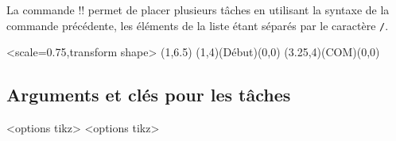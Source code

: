 \documentclass[french,a4paper,11pt]{article}
\begin{document}
\begin{tipblock}
La commande \motcletex!\MPMPlaceTaches! permet de placer plusieurs tâches en utilisant la syntaxe de la commande précédente, les éléments de la liste étant séparés par le caractère \verb!/!.
\end{tipblock}

\begin{DemoCode}[]
\begin{GrapheMPM}[CouleurDates=green/orange,CouleurBords=brown,Grille={18,8}]%
	<scale=0.75,transform shape>
	\MPMPlaceNotice(1,6.5)
	\MPMPlaceTache(1,4)(Début)(0,0)
	\MPMPlaceTache(3.25,4)(COM)(0,0)
\end{GrapheMPM}
\end{DemoCode}

\pagebreak

\subsection{Arguments et clés pour les tâches}

\begin{DemoCode}
\begin{GrapheMPM}[clés]<options tikz>
	<options tikz>
\end{GrapheMPM}
\end{DemoCode}
\end{document}
